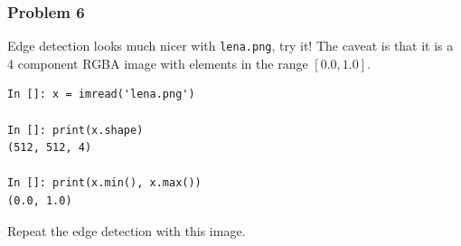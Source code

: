 \documentclass[14pt,compress]{beamer}
\newcommand{\typ}[1]{\lstinline{#1}}
\begin{document}
\begin{frame}[fragile]
  \frametitle{Problem 6}

  Edge detection looks much nicer with \typ{lena.png}, try it!  The
  caveat is that it is a 4 component RGBA image with elements in the
  range $[0.0, 1.0]$.

\begin{lstlisting}
In []: x = imread('lena.png')

In []: print(x.shape)
(512, 512, 4)

In []: print(x.min(), x.max())
(0.0, 1.0)
\end{lstlisting}

 Repeat the edge detection with this image.

\end{frame}
\end{document}
